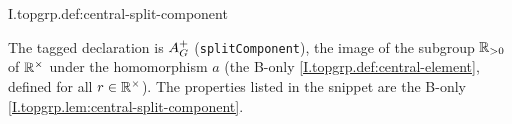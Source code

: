 \begin{definition}[$\AGplus$]
\end{definition}
\begin{tfformal}{I.topgrp.def:central-split-component}
\begin{tffidelity}
The tagged declaration is $\AGplus$ (\texttt{splitComponent}), the image of the subgroup $\mathbb{R}_{>0}$ of $\mathbb{R}^\times$ under the homomorphism $a$ (the B-only \cref{I.topgrp.def:central-element}, defined for all $r\in\mathbb{R}^\times$). The properties listed in the snippet are the B-only \cref{I.topgrp.lem:central-split-component}.
\end{tffidelity}
\end{tfformal}

